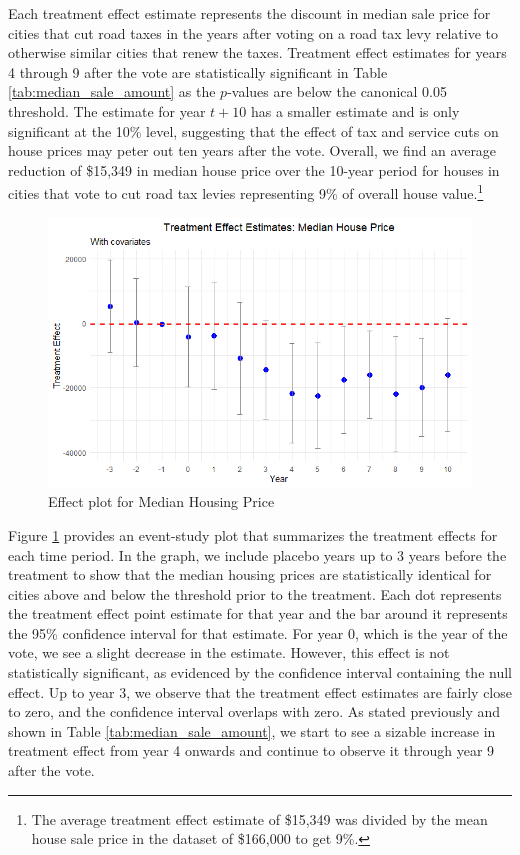 Each treatment effect estimate represents the discount in median sale price for cities that cut road taxes in the years after voting on a road tax levy relative to otherwise similar cities that renew the taxes. Treatment effect estimates for years 4 through 9 after the vote are statistically significant in Table \ref{tab:median_sale_amount} as the $p$-values are below the canonical 0.05 threshold. The estimate for year $t + 10$ has a smaller estimate and is only significant at the 10\% level, suggesting that the effect of tax and service cuts on house prices may peter out ten years after the vote. Overall, we find an average reduction of \$15,349 in median house price over the 10-year period for houses in cities that vote to cut road tax levies representing 9\% of overall house value.\footnote{The average treatment effect estimate of \$15,349 was divided by the mean house sale price in the dataset of \$166,000 to get 9\%.}

\begin{figure}[htbp]
    \centering
    \includegraphics[width=\textwidth,keepaspectratio]{images/tes_gs_reg.png}    
    \caption{Effect plot for Median Housing Price}
    \label{fig:tes_hp}
\end{figure}

Figure \ref{fig:tes_hp} provides an event-study plot that summarizes the treatment effects for each time period. In the graph, we include placebo years up to 3 years before the treatment to show that the median housing prices are statistically identical for cities above and below the threshold prior to the treatment. Each dot represents the treatment effect point estimate for that year and the bar around it represents the 95\% confidence interval for that estimate. For year 0, which is the year of the vote, we see a slight decrease in the estimate. However, this effect is not statistically significant, as evidenced by the confidence interval containing the null effect. Up to year 3, we observe that the treatment effect estimates are fairly close to zero, and the confidence interval overlaps with zero. As stated previously and shown in Table \ref{tab:median_sale_amount}, we start to see a sizable increase in treatment effect from year 4 onwards and continue to observe it through year 9 after the vote. 
 
